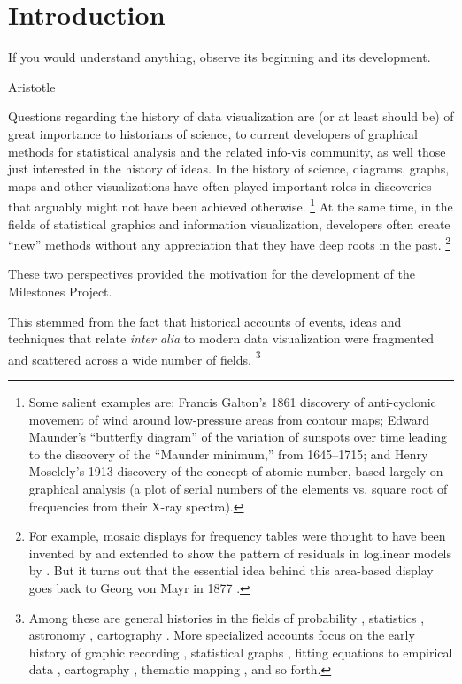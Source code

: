 \section{Introduction}\label{sec:intro}
\epigraph{If you would understand anything, observe its beginning and its development.}{Aristotle}

Questions regarding the history of data visualization are (or at least should be) of great importance to historians of science, to current developers of graphical methods for statistical analysis and the related info-vis community, as well those just interested in the history of ideas. In the history of science, diagrams, graphs, maps and other visualizations have often played important roles in discoveries that arguably might not have been achieved otherwise.%
\footnote{
	Some salient examples are:
	Francis Galton's 1861 discovery of anti-cyclonic movement of wind around low-pressure areas from contour maps; Edward Maunder's ``butterfly diagram'' of the variation of sunspots over time leading to the	discovery of the ``Maunder minimum,'' from 1645--1715; and Henry Moselely's 1913 discovery of the concept of atomic number, based largely on graphical analysis (a plot of serial numbers of the elements vs. square root of frequencies from their X-ray spectra).
}
At the same time, in the fields of statistical graphics and information visualization, developers often create ``new'' methods without any appreciation that they have deep roots in the past.%
\footnote{
  For example, mosaic displays for frequency tables were thought to have been invented by \citet{HartiganKleiner:81} and extended to show the pattern of residuals in loglinear models by \citet{Friendly:94a}. But it turns out that the essential idea behind this area-based display  goes back to Georg von Mayr in 1877 \citep{Friendly:2002:mosahist}.
}

These two perspectives provided the motivation for the development of the Milestones Project. 

This stemmed from the fact that historical accounts of events, ideas and techniques that relate \emph{inter alia} to modern data visualization were fragmented and scattered across a wide number of fields.%
\footnote{
Among these are general histories in the fields of probability \citep{Hald:1990}, statistics \citep{Pearson:1978,Porter:1986,Stigler:1986}, astronomy \citep{Riddell:1980}, cartography \citep{WallisRobinson:87}. More specialized accounts focus on the early history of graphic recording \citep{HoffGeddes:1959,HoffGeddes:1962}, statistical graphs \citep{Funkhouser:1936,Funkhouser:1937,Royston:1970,Tilling:1975}, fitting equations to empirical data \citep{Farebrother:1999}, cartography \citep{Friis:1974,Kruskal:1977}, thematic mapping \citep{FriendlyPalsky:2007,Palsky:1996,Robinson:1982}, and so forth.
}

